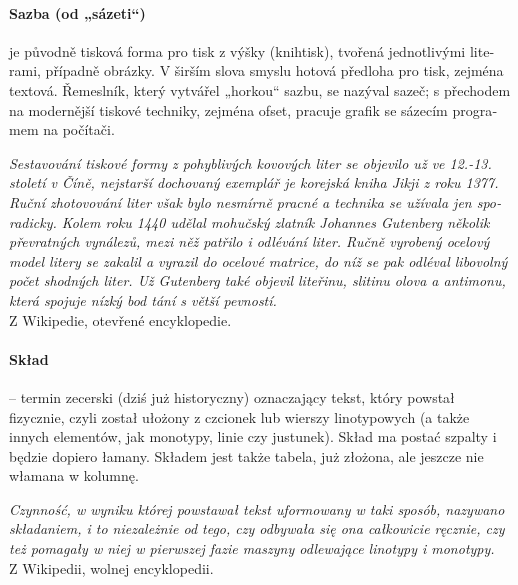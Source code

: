 \documentclass[pagesize,DIV14]{scrartcl}
\begin{document}
\begin{multicols}{2}
\begin{czech}
\paragraph*{Sazba (od „sázeti“)} je původně tisková forma pro tisk z výšky (knihtisk), tvořená jednotlivými literami, případně obrázky. V širším slova smyslu hotová předloha pro tisk, zejména textová. Řemeslník, který vytvářel „horkou“ sazbu, se nazýval sazeč; s přechodem na modernější tiskové techniky, zejména ofset, pracuje grafik se sázecím programem na počítači.\par
\textit{Sestavování tiskové formy z pohyblivých kovových liter se objevilo už ve 12.-13. století v Číně, nejstarší dochovaný exemplář je korejská kniha Jikji z roku 1377. Ruční zhotovování liter však bylo nesmírně pracné a technika se užívala jen sporadicky. Kolem roku 1440 udělal mohučský zlatník Johannes Gutenberg několik převratných vynálezů, mezi něž patřilo i odlévání liter. Ručně vyrobený ocelový model litery se zakalil a vyrazil do ocelové matrice, do níž se pak odléval libovolný počet shodných liter. Už Gutenberg také objevil liteřinu, slitinu olova a antimonu, která spojuje nízký bod tání s větší pevností.}\\
{\scriptsize Z Wikipedie, otevřené encyklopedie.}
\end{czech}

\begin{polish}
\paragraph*{Skład} – termin zecerski (dziś już historyczny) oznaczający tekst, który powstał fizycznie, czyli został ułożony z czcionek lub wierszy linotypowych (a także innych elementów, jak monotypy, linie czy justunek). Skład ma postać szpalty i będzie dopiero łamany. Składem jest także tabela, już złożona, ale jeszcze nie włamana w kolumnę.\par
\textit{Czynność, w wyniku której powstawał tekst uformowany w taki sposób, nazywano składaniem, i to niezależnie od tego, czy odbywała się ona całkowicie ręcznie, czy też pomagały w niej w pierwszej fazie maszyny odlewające linotypy i monotypy.}\\
{\scriptsize Z Wikipedii, wolnej encyklopedii.}
\end{polish}

\begin{slovenian}

\end{slovenian}
\end{multicols}
\end{document}

